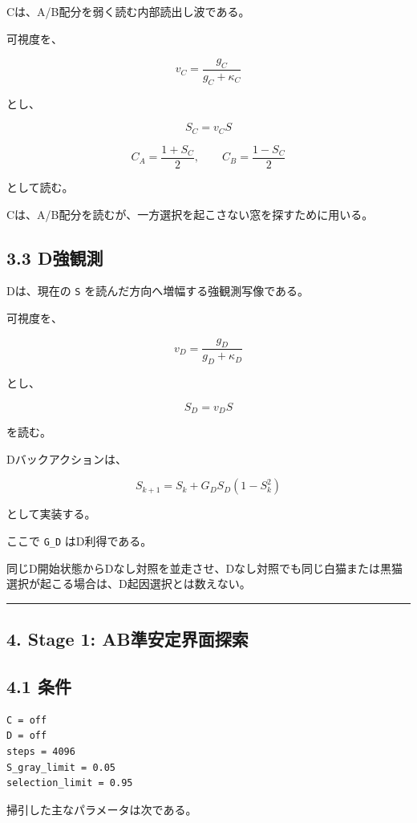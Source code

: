 \documentclass{article}
\begin{document}
Cは、A/B配分を弱く読む内部読出し波である。

可視度を、

\[
v_C=\frac{g_C}{g_C+\kappa_C}
\]

とし、

\[
S_C=v_CS
\]

\[
C_A=\frac{1+S_C}{2},
\qquad
C_B=\frac{1-S_C}{2}
\]

として読む。

Cは、A/B配分を読むが、一方選択を起こさない窓を探すために用いる。

\subsection{3.3 D強観測}\label{dux5f37ux89b3ux6e2c}

Dは、現在の \texttt{S} を読んだ方向へ増幅する強観測写像である。

可視度を、

\[
v_D=\frac{g_D}{g_D+\kappa_D}
\]

とし、

\[
S_D=v_DS
\]

を読む。

Dバックアクションは、

\[
S_{k+1}
=
S_k
+
G_D S_D(1-S_k^2)
\]

として実装する。

ここで \texttt{G\_D} はD利得である。

同じD開始状態からDなし対照を並走させ、Dなし対照でも同じ白猫または黒猫選択が起こる場合は、D起因選択とは数えない。

\begin{center}\rule{0.5\linewidth}{0.5pt}\end{center}

\subsection{4. Stage 1:
AB準安定界面探索}\label{stage-1-abux6e96ux5b89ux5b9aux754cux9762ux63a2ux7d22}

\subsection{4.1 条件}\label{ux6761ux4ef6}

\begin{verbatim}
C = off
D = off
steps = 4096
S_gray_limit = 0.05
selection_limit = 0.95
\end{verbatim}

掃引した主なパラメータは次である。
\end{document}
